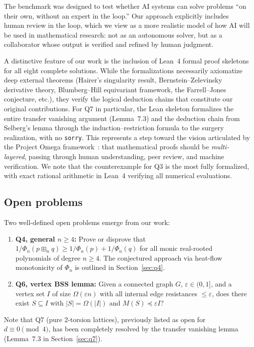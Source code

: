 The benchmark was designed to test whether AI systems can solve problems
``on their own, without an expert in the loop.''
Our approach explicitly includes human review in the loop, which we view
as a more realistic model of how AI will be used in mathematical research:
not as an autonomous solver, but as a collaborator whose output is
verified and refined by human judgment.

A distinctive feature of our work is the inclusion of Lean~4 formal
proof skeletons for all eight complete solutions.
While the formalizations necessarily axiomatize deep external theorems
(Hairer's singularity result, Bernstein--Zelevinsky derivative theory,
Blumberg--Hill equivariant framework, the Farrell--Jones conjecture,
etc.), they verify the logical
deduction chains that constitute our original contributions.
For Q7 in particular, the Lean skeleton formalizes the entire
transfer vanishing argument (Lemma~7.3) and the deduction chain from
Selberg's lemma through the induction--restriction formula to the
surgery realization, with no \texttt{sorry}.
This represents a step toward the vision articulated
by the Project Omega framework~\cite{omega-theory}: that mathematical
proofs should be \emph{multi-layered}, passing through human understanding,
peer review, and machine verification.
We note that the counterexample for Q3 is the most fully formalized,
with exact rational arithmetic in Lean~4 verifying all numerical evaluations.

\subsection{Open problems}

Two well-defined open problems emerge from our work:

\begin{enumerate}[nosep]
\item \textbf{Q4, general $n\ge 4$:}
  Prove or disprove that $1/\Phi_n(p\boxplus_n q)\ge 1/\Phi_n(p)+1/\Phi_n(q)$
  for all monic real-rooted polynomials of degree $n\ge 4$.
  The conjectured approach via heat-flow monotonicity of $\Phi_n$
  is outlined in Section~\ref{sec:q4}.

\item \textbf{Q6, vertex BSS lemma:}
  Given a connected graph $G$, $\varepsilon\in(0,1]$, and a vertex set $I$
  of size $\Omega(\varepsilon n)$ with all internal edge resistances $\le\varepsilon$,
  does there exist $S\subseteq I$ with $|S|=\Omega(|I|)$ and
  $M(S)\preceq \varepsilon I$?
\end{enumerate}

\noindent
Note that Q7 (pure 2-torsion lattices), previously listed as open for
$d\equiv 0\pmod{4}$, has been completely resolved by the
transfer vanishing lemma (Lemma~7.3 in Section~\ref{sec:q7}).
